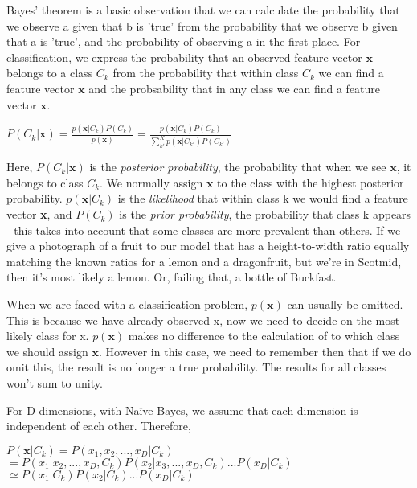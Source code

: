 \documentclass[10pt,a4paper]{article}
\begin{document}
	Bayes' theorem is a basic observation that we can calculate the probability that we observe a given that b is 'true' from the probability that we observe b given that a is 'true', and the probability of observing a in the first place. For classification, we express the probability that an observed feature vector $\bm x$ belongs to a class $C_k$ from the probability that within class $C_k$ we can find a feature vector $\bm x$ and the probsability that in any class we can find a feature vector $\bm x$.
	
	\begin{center}
		$
		P(C_k|\mathbf{x}) = \frac{p(\mathbf{x}|C_k)P(C_k)}{p(\mathbf{x})}
		=
		\frac{p(\mathbf{x}|C_k)P(C_k)}{\sum\limits_{k'}^Kp(\mathbf{x}|C_{k'})P(C_{k'})}
		$
	\end{center} 
	
	Here, $P(C_k|\bm x)$ is the \textit{posterior probability}, the probability that when we see $\bm x$, it belongs to class $C_k$. We normally assign $\bm x$ to the class with the highest posterior probability. $p(\bm x|C_k)$ is the \textit{likelihood} that within class k we would find a feature vector \textbf{x}, and $P(C_k)$ is the \textit{prior probability}, the probability that class k appears - this takes into account that some classes are more prevalent than others. If we give a photograph of a fruit to our model that has a height-to-width ratio equally matching the known ratios for a lemon and a dragonfruit, but we're in Scotmid, then it's most likely a lemon. Or, failing that, a bottle of Buckfast.
	
	When we are faced with a classification problem, $p(\bm x)$ can usually be omitted. This is because we have already observed x, now we need to decide on the most likely class for x. $p(\bm{x})$ makes no difference to the calculation of to which class we should assign $\bm x$. However in this case, we need to remember then that if we do omit this, the result is no longer a true probability. The results for all classes won't sum to unity.
	
	For D dimensions, with Naïve Bayes, we assume that each dimension is independent of each other. Therefore,
	
	\begin{center}
		

		$P(\bm x|C_k) = P(x_1, x_2, ..., x_D|C_k)$
		\newline \newline
		$= P(x_1|x_2, ..., x_D, C_k) P(x_2|x_3, ..., x_D, C_k) ... P(x_D|C_k)$
		\newline \newline
		$\simeq  P(x_1|C_k)P(x_2|C_k)...P(x_D|C_k)$

	\end{center}
	
\end{document}

